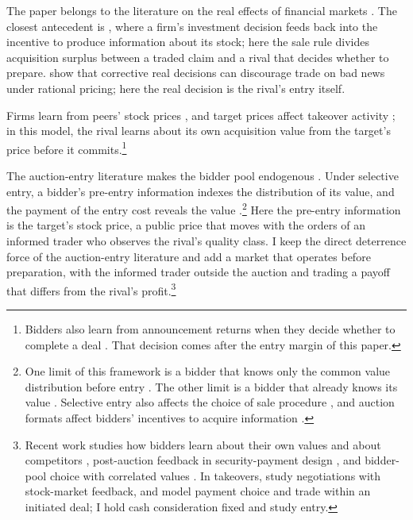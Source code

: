 The paper belongs to the literature on the real effects of financial markets \citep{BondEdmansGoldstein2012}.
The closest antecedent is \citet{DowGoldsteinGuembel2017}, where a firm's investment decision feeds back into
the incentive to produce information about its stock; here the sale rule divides acquisition surplus between a
traded claim and a rival that decides whether to prepare. \citet{EdmansGoldsteinJiang2015} show that corrective
real decisions can discourage trade on bad news under rational pricing; here the real decision is the rival's
entry itself.

Firms learn from peers' stock prices \citep{FoucaultFresard2014}, and target prices affect takeover activity
\citep{EdmansGoldsteinJiang2012}; in this model, the rival learns about its own acquisition value
from the target's price before it commits.\footnote{Bidders also learn from announcement returns when they decide
whether to complete a deal \citep{Luo2005}. That decision comes after the entry margin of this paper.}

The auction-entry literature makes the bidder pool endogenous
\citep{Samuelson1985,McAfeeMcMillan1987,LevinSmith1994,GentryStroup2019}. Under selective entry, a bidder's
pre-entry information indexes the distribution of its value, and the payment of the entry cost reveals the value
\citep{RobertsSweeting2013}.\footnote{One limit of this framework is a bidder that knows only the common value
distribution before entry \citep{LevinSmith1994}. The other limit is a bidder that already knows its value
\citep{Samuelson1985}. Selective entry also affects the choice of sale procedure \citep{RobertsSweeting2013}, and
auction formats affect bidders' incentives to acquire information \citep{Persico2000}.} Here the pre-entry
information is the target's stock price, a public price that moves with the orders of an informed trader who observes
the rival's quality class. I keep the direct deterrence force of the auction-entry literature and add a
market that operates before preparation, with the informed trader outside the auction and trading a payoff that
differs from the rival's profit.\footnote{Recent work studies how bidders learn about their own values and
about competitors \citep{PernoudGleyze2026}, post-auction feedback in security-payment design
\citep{LiuBernhardt2022}, and bidder-pool choice with correlated values \citep{CarlinEtAl2026}. In takeovers,
\citet{BettonEtAl2014} study negotiations with stock-market feedback, and \citet{LinMaYangZhu2025} model payment
choice and trade within an initiated deal; I hold cash consideration fixed and study entry.}

